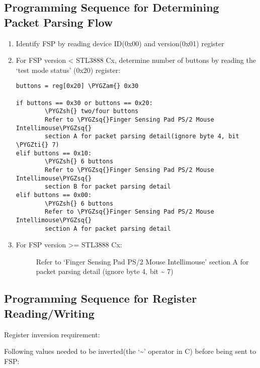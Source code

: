 \documentclass[a4paper,8pt,english]{sphinxmanual}
\def\PYGZam{\char`\&}
\def\PYGZsh{\char`\#}
\def\PYGZsq{\char`\'}
\def\PYGZti{\char`\~}
\renewcommand\PYGZsq{\textquotesingle}
\begin{document}
\subsection{Programming Sequence for Determining Packet Parsing Flow}
\label{input/devices/sentelic:programming-sequence-for-determining-packet-parsing-flow}\begin{enumerate}
\item {} 
Identify FSP by reading device ID(0x00) and version(0x01) register

\item {} 
For FSP version \textless{} STL3888 Cx, determine number of buttons by reading
the `test mode status' (0x20) register:

\begin{Verbatim}[commandchars=\\\{\}]
buttons = reg[0x20] \PYGZam{} 0x30

if buttons == 0x30 or buttons == 0x20:
        \PYGZsh{} two/four buttons
        Refer to \PYGZsq{}Finger Sensing Pad PS/2 Mouse Intellimouse\PYGZsq{}
        section A for packet parsing detail(ignore byte 4, bit \PYGZti{} 7)
elif buttons == 0x10:
        \PYGZsh{} 6 buttons
        Refer to \PYGZsq{}Finger Sensing Pad PS/2 Mouse Intellimouse\PYGZsq{}
        section B for packet parsing detail
elif buttons == 0x00:
        \PYGZsh{} 6 buttons
        Refer to \PYGZsq{}Finger Sensing Pad PS/2 Mouse Intellimouse\PYGZsq{}
        section A for packet parsing detail
\end{Verbatim}

\item {} \begin{description}
\item[{For FSP version \textgreater{}= STL3888 Cx:}] \leavevmode
Refer to `Finger Sensing Pad PS/2 Mouse Intellimouse'
section A for packet parsing detail (ignore byte 4, bit \textasciitilde{} 7)

\end{description}

\end{enumerate}


\subsection{Programming Sequence for Register Reading/Writing}
\label{input/devices/sentelic:programming-sequence-for-register-reading-writing}
Register inversion requirement:

Following values needed to be inverted(the `\textasciitilde{}' operator in C) before being
sent to FSP:
\end{document}
